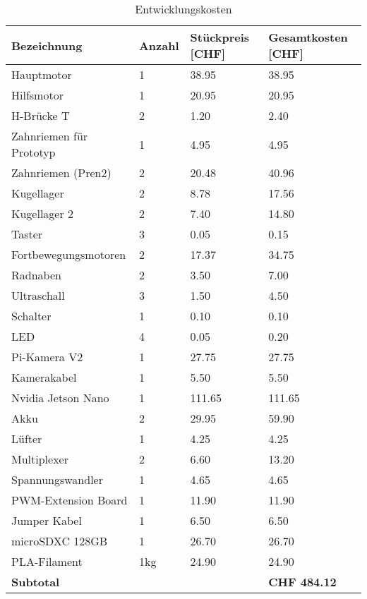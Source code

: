 \begin{center}
\centering
\begin{table}[H]
\begin{tabularx}{\textwidth}{|X|l|X|X|}
\hline 
\textbf{Bezeichnung} & \textbf{Anzahl} &
\textbf{Stückpreis [CHF]} & \textbf{Gesamtkosten [CHF]} \\
\hline 
Hauptmotor & 1 & 38.95 & 38.95 \\
\hline
Hilfsmotor & 1 & 20.95 & 20.95 \\
\hline
H-Brücke T & 2 & 1.20 & 2.40 \\
\hline
Zahnriemen für Prototyp & 1 & 4.95 & 4.95 \\
\hline
Zahnriemen (Pren2)  & 2 & 20.48 & 40.96 \\
\hline
Kugellager & 2 & 8.78 & 17.56 \\
\hline
Kugellager 2 & 2 & 7.40 & 14.80  \\
\hline
Taster & 3 & 0.05  & 0.15 \\
\hline
Fortbewegungsmotoren & 2 & 17.37 & 34.75 \\
\hline
Radnaben & 2 & 3.50 & 7.00 \\
\hline
Ultraschall & 3 & 1.50 & 4.50 \\
\hline
Schalter & 1 & 0.10 & 0.10 \\
\hline
LED & 4 & 0.05 & 0.20 \\
\hline
Pi-Kamera V2 & 1 & 27.75 & 27.75 \\
\hline
Kamerakabel & 1 & 5.50 & 5.50 \\
\hline
Nvidia Jetson Nano & 1 & 111.65 & 111.65 \\
\hline
Akku & 2 & 29.95 & 59.90\\
\hline
Lüfter & 1 & 4.25 & 4.25 \\
\hline
Multiplexer & 2 & 6.60 & 13.20 \\
\hline
Spannungswandler & 1 & 4.65 & 4.65 \\
\hline
PWM-Extension Board & 1 & 11.90 & 11.90 \\
\hline
Jumper Kabel & 1 & 6.50 & 6.50 \\
\hline
microSDXC 128GB & 1 & 26.70 & 26.70 \\
\hline
PLA-Filament & 1kg & 24.90 & 24.90 \\
\hline

\hline \hline 
 \textbf{Subtotal} &&& \textbf{CHF 484.12}\\
\hline 
\end{tabularx}
\caption[Entwicklungskosten]{Entwicklungskosten}
\label{tab:kosten}
\end{table}
\end{center}

